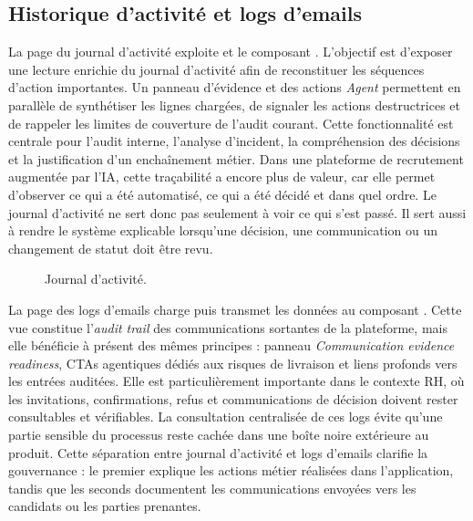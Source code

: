 \subsection{Historique d'activité et logs d'emails}
La page du journal d'activité exploite  et le composant . L'objectif est d'exposer une lecture enrichie du journal d'activité afin de reconstituer les séquences d'action importantes. Un panneau d'évidence et des actions \textit{Agent} permettent en parallèle de synthétiser les lignes chargées, de signaler les actions destructrices et de rappeler les limites de couverture de l'audit courant.
Cette fonctionnalité est centrale pour l'audit interne, l'analyse d'incident, la compréhension des décisions et la justification d'un enchaînement métier. Dans une plateforme de recrutement augmentée par l'IA, cette traçabilité a encore plus de valeur, car elle permet d'observer ce qui a été automatisé, ce qui a été décidé et dans quel ordre.
Le journal d'activité ne sert donc pas seulement à voir ce qui s'est passé. Il sert aussi à rendre le système explicable lorsqu'une décision, une communication ou un changement de statut doit être revu.
\begin{figure}[H]
  \centering
  \caption{Journal d'activité.}
\end{figure}
La page des logs d'emails charge  puis transmet les données au composant . Cette vue constitue l'\textit{audit trail} des communications sortantes de la plateforme, mais elle bénéficie à présent des mêmes principes : panneau \textit{Communication evidence readiness}, CTAs agentiques dédiés aux risques de livraison et liens profonds vers les entrées auditées.
Elle est particulièrement importante dans le contexte RH, où les invitations, confirmations, refus et communications de décision doivent rester consultables et vérifiables. La consultation centralisée de ces logs évite qu'une partie sensible du processus reste cachée dans une boîte noire extérieure au produit.
Cette séparation entre journal d'activité et logs d'emails clarifie la gouvernance : le premier explique les actions métier réalisées dans l'application, tandis que les seconds documentent les communications envoyées vers les candidats ou les parties prenantes.

